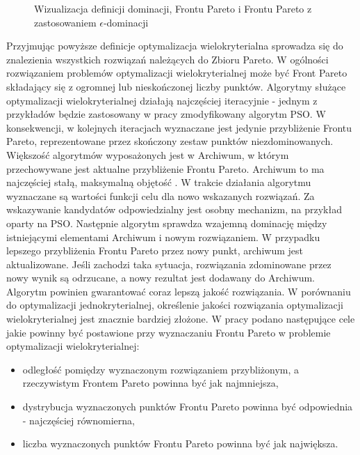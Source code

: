 \begin{figure}[hbt!]
	\centering
	\captionsetup{justification=centering}
	\caption{Wizualizacja definicji dominacji, Frontu Pareto i Frontu Pareto z zastosowaniem $\epsilon$-dominacji}
	\label{fig: PSO_pareto_visualization}
\end{figure}

Przyjmując powyższe definicje optymalizacja wielokryterialna sprowadza się do znalezienia wszystkich rozwiązań należących do Zbioru Pareto. W ogólności rozwiązaniem problemów optymalizacji wielokryterialnej może być Front Pareto składający się z ogromnej lub nieskończonej liczby punktów. Algorytmy służące optymalizacji wielokryterialnej działają najczęściej iteracyjnie - jednym z przykładów będzie zastosowany w pracy zmodyfikowany algorytm PSO. W konsekwencji, w kolejnych iteracjach wyznaczane jest jedynie przybliżenie Frontu Pareto, reprezentowane przez skończony zestaw punktów niezdominowanych. Większość algorytmów wyposażonych jest w Archiwum, w którym przechowywane jest aktualne przybliżenie Frontu Pareto. Archiwum to ma najczęściej stałą, maksymalną objętość \parencite{Banach2017}. W trakcie działania algorytmu wyznaczane są wartości funkcji celu dla nowo wskazanych rozwiązań. Za wskazywanie kandydatów odpowiedzialny jest osobny mechanizm, na przykład oparty na PSO. Następnie algorytm sprawdza wzajemną dominację między istniejącymi elementami Archiwum i nowym rozwiązaniem. W przypadku lepszego przybliżenia Frontu Pareto przez nowy punkt, archiwum jest aktualizowane. Jeśli zachodzi taka sytuacja, rozwiązania zdominowane przez nowy wynik są odrzucane, a nowy rezultat jest dodawany do Archiwum. Algorytm powinien gwarantować coraz lepszą jakość rozwiązania. W porównaniu do optymalizacji jednokryterialnej, określenie jakości rozwiązania optymalizacji wielokryterialnej jest znacznie bardziej złożone. W pracy \cite{Zitzler2000} podano następujące cele jakie powinny być postawione przy wyznaczaniu Frontu Pareto w problemie optymalizacji wielokryterialnej:
\begin{itemize}
	\item odległość pomiędzy wyznaczonym rozwiązaniem przybliżonym, a rzeczywistym Frontem Pareto powinna być jak najmniejsza,
	\item dystrybucja wyznaczonych punktów Frontu Pareto powinna być odpowiednia - najczęściej równomierna,
	\item liczba wyznaczonych punktów Frontu Pareto powinna być jak największa.
\end{itemize}

